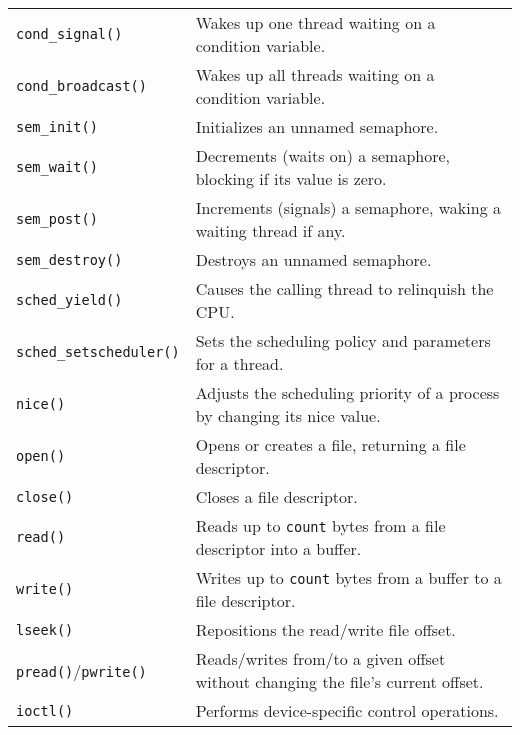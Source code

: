 \documentclass[openany,12pt]{book}
\newcommand{\code}[1]{\texttt{#1}}
\begin{document}
\begin{longtable}{|>{\raggedright\arraybackslash}p{3.5cm}|>{\raggedright\arraybackslash}p{11.5cm}|}
  \code{cond\_signal()} & Wakes up one thread waiting on a condition variable.                                            \\
  \code{cond\_broadcast()} & Wakes up all threads waiting on a condition variable.                                         \\
  \code{sem\_init()} & Initializes an unnamed semaphore.                                                                 \\
  \code{sem\_wait()} & Decrements (waits on) a semaphore, blocking if its value is zero.                                 \\
  \code{sem\_post()} & Increments (signals) a semaphore, waking a waiting thread if any.                                 \\
  \code{sem\_destroy()} & Destroys an unnamed semaphore.                                                                  \\
  \hline
  \code{sched\_yield()} & Causes the calling thread to relinquish the CPU.                                                \\
  \code{sched\_setscheduler()} & Sets the scheduling policy and parameters for a thread.                                     \\
  \code{nice()}     & Adjusts the scheduling priority of a process by changing its nice value.                          \\
  \hline
  \code{open()}     & Opens or creates a file, returning a file descriptor.                                             \\
  \code{close()}    & Closes a file descriptor.                                                                         \\
  \code{read()}     & Reads up to \code{count} bytes from a file descriptor into a buffer.                              \\
  \code{write()}    & Writes up to \code{count} bytes from a buffer to a file descriptor.                               \\
  \code{lseek()}    & Repositions the read/write file offset.                                                           \\
  \code{pread()}/\code{pwrite()} & Reads/writes from/to a given offset without changing the file's current offset.         \\
  \code{ioctl()}    & Performs device-specific control operations.                                                      \\

\end{longtable}
\end{document}
